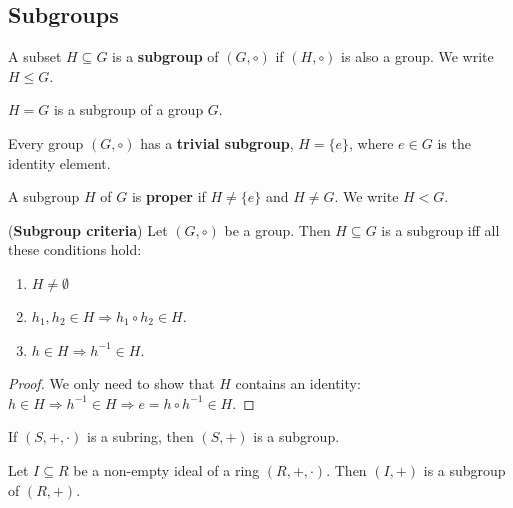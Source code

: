 \subsection{Subgroups}

\begin{definition}
	A subset $H \subseteq G$ is a \textbf{subgroup} of $(G, \circ)$ if $(H, \circ)$ is also a group. We write $H \le G$.
\end{definition}

\begin{remark}
	$H = G$ is a subgroup of a group $G$.
\end{remark}

\begin{definition}
	Every group $(G, \circ)$ has a \textbf{trivial subgroup}, $H = \{ e \}$, where $e \in G$ is the identity element.
\end{definition}

\begin{definition}
	A subgroup $H$ of $G$ is \textbf{proper} if $H \ne \{ e \}$ and $H \ne G$. We write $H < G$.
\end{definition}

\begin{proposition}\label{prop:subgroupCriteria}
	(\textbf{Subgroup criteria}) Let $(G, \circ)$ be a group. Then $H \subseteq G$ is a subgroup iff all these conditions hold:
	\begin{enumerate}
		\item $H \ne \emptyset$
		\item $h_1, h_2 \in H \Rightarrow h_1 \circ h_2 \in H$.
		\item $h \in H \Rightarrow h^{-1} \in H$.
	\end{enumerate}
\end{proposition}

\begin{proof}
	We only need to show that $H$ contains an identity: $h \in H \Rightarrow h^{-1} \in H \Rightarrow e = h \circ h^{-1} \in H$.
\end{proof}

\begin{example}
	If $(S, +, \cdot)$ is a subring, then $(S, +)$ is a subgroup.
\end{example}

\begin{proposition}
	Let $I \subseteq R$ be a non-empty ideal of a ring $(R, +, \cdot)$. Then $(I, +)$ is a subgroup of $(R, +)$.
\end{proposition}

